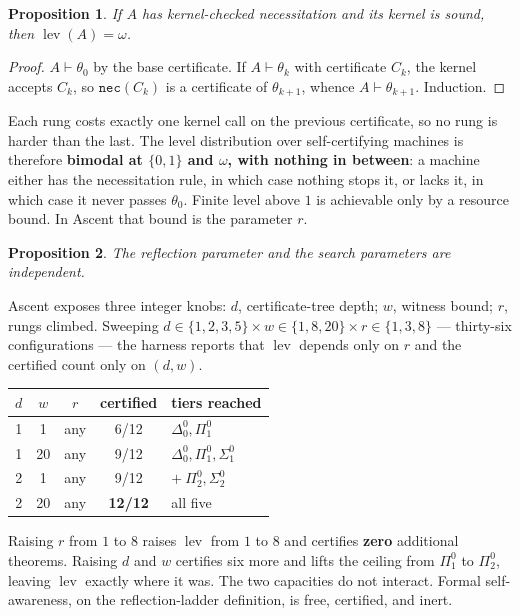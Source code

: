 \documentclass[11pt,a4paper]{article}
\newtheorem{proposition}{Proposition}
\newcommand{\Sig}[2]{\Sigma^{#1}_{#2}}
\newcommand{\Pai}[2]{\Pi^{#1}_{#2}}
\newcommand{\Del}[2]{\Delta^{#1}_{#2}}
\newcommand{\lev}{\operatorname{lev}}
\begin{document}
\begin{proposition}
If $A$ has kernel-checked necessitation and its kernel is sound, then
$\lev(A) = \omega$.
\end{proposition}

\begin{proof}
$A \vdash \theta_0$ by the base certificate. If $A \vdash \theta_k$ with
certificate $C_k$, the kernel accepts $C_k$, so $\texttt{nec}(C_k)$ is a
certificate of $\theta_{k+1}$, whence $A \vdash \theta_{k+1}$. Induction.
\end{proof}

Each rung costs exactly one kernel call on the previous certificate, so no rung
is harder than the last. The level distribution over self-certifying machines
is therefore \textbf{bimodal at $\{0,1\}$ and $\omega$, with nothing in
between}: a machine either has the necessitation rule, in which case nothing
stops it, or lacks it, in which case it never passes $\theta_0$. Finite level
above $1$ is achievable only by a resource bound. In Ascent that bound is the
parameter $r$.

\begin{proposition}
The reflection parameter and the search parameters are independent.
\end{proposition}

Ascent exposes three integer knobs: $d$, certificate-tree depth; $w$, witness
bound; $r$, rungs climbed. Sweeping $d \in \{1,2,3,5\} \times w \in \{1,8,20\}
\times r \in \{1,3,8\}$ --- thirty-six configurations --- the harness reports
that $\lev$ depends only on $r$ and the certified count only on $(d,w)$.

\begin{center}
\begin{tabular}{@{}ccccl@{}}
\toprule
$d$ & $w$ & $r$ & certified & tiers reached \\
\midrule
1 & 1 & any & 6/12 & $\Del{0}{0}, \Pai{0}{1}$ \\
1 & 20 & any & 9/12 & $\Del{0}{0}, \Pai{0}{1}, \Sig{0}{1}$ \\
2 & 1 & any & 9/12 & $+\ \Pai{0}{2}, \Sig{0}{2}$ \\
2 & 20 & any & \textbf{12/12} & all five \\
\bottomrule
\end{tabular}
\end{center}

Raising $r$ from $1$ to $8$ raises $\lev$ from $1$ to $8$ and certifies
\textbf{zero} additional theorems. Raising $d$ and $w$ certifies six more and
lifts the ceiling from $\Pai{0}{1}$ to $\Pai{0}{2}$, leaving $\lev$ exactly
where it was. The two capacities do not interact. Formal self-awareness, on the
reflection-ladder definition, is free, certified, and inert.
\end{document}
